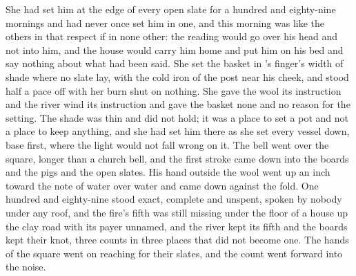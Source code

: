 She had set him at the edge of every open slate for a hundred and eighty-nine mornings and had never once set him in one, and this morning was like the others in that respect if in none other: the reading would go over his head and not into him, and the house would carry him home and put him on his bed and say nothing about what had been said. She set the basket in 's finger's width of shade where no slate lay, with the cold iron of the post near his cheek, and stood half a pace off with her burn shut on nothing. She gave the wool its instruction and the river wind its instruction and gave the basket none and no reason for the setting. The shade was thin and did not hold; it was a place to set a pot and not a place to keep anything, and she had set him there as she set every vessel down, base first, where the light would not fall wrong on it. The bell went over the square, longer than a church bell, and the first stroke came down into the boards and the pigs and the open slates. His hand outside the wool went up an inch toward the note of water over water and came down against the fold. One hundred and eighty-nine stood exact, complete and unspent, spoken by nobody under any roof, and the fire's fifth was still missing under the floor of a house up the clay road with its payer unnamed, and the river kept its fifth and the boards kept their knot, three counts in three places that did not become one. The hands of the square went on reaching for their slates, and the count went forward into the noise.
